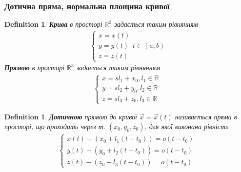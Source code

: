 \documentclass[a4paper, 10pt]{article}
\theoremstyle{theoremdd}
\theoremstyle{theoremdd}
\newtheorem{definition}[theorem]{Definition}
\theoremstyle{theoremdd}
\theoremstyle{theoremdd}
\theoremstyle{theoremdd}
\theoremstyle{theoremdd}
\theoremstyle{theoremdd}
\theoremstyle{theoremdd}
\begin{document}
\subsubsection{Дотична пряма, нормальна площина кривої}
\begin{definition}
\textbf{Крива} в просторі $\mathbb{R}^3$ задається таким рівнянням
\begin{align*}
\begin{cases} x = x(t) \\ y = y(t) \\ z = z(t) \end{cases} t \in (a,b)
\end{align*}
\textbf{Прямою} в просторі $\mathbb{R}^3$ задається таким рівнянням
\begin{align*}
\begin{cases}
x = s l_1 + x_0, l_1 \in \mathbb{R} \\
y = s l_2 + y_0, l_2 \in \mathbb{R} \\
z = s l_3 + z_0, l_3 \in \mathbb{R}
\end{cases}
\end{align*}
\end{definition}

\begin{definition}
\textbf{Дотичною} прямою до кривої $\vec{x} = \vec{x}(t)$ називається пряма в просторі, що проходить через т. $(x_0,y_0,z_0)$, для якої виконана рівність
\begin{align*}
\begin{cases}
x(t) - (x_0 + l_1(t-t_0)) = o(t-t_0) \\
y(t) - (y_0 + l_2(t-t_0)) = o(t-t_0) \\
z(t) - (z_0 + l_3(t-t_0)) = o(t-t_0)
\end{cases}
\end{align*}
\end{definition}
\end{document}
